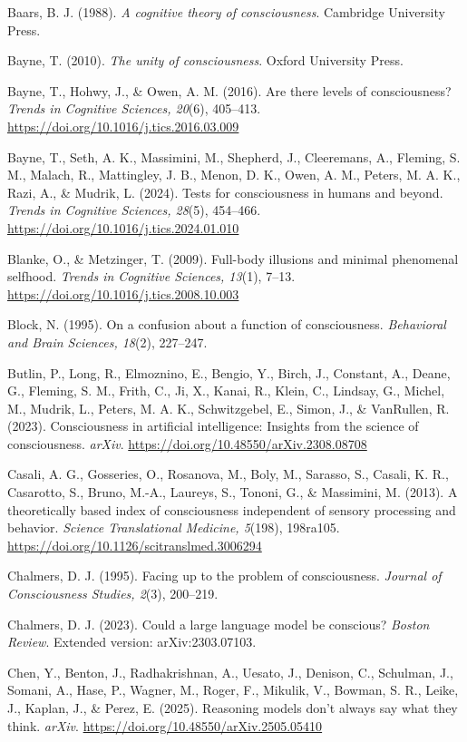 \documentclass[
  11pt,
]{article}
\begin{document}
Baars, B. J. (1988). \emph{A cognitive theory of consciousness}.
Cambridge University Press.

Bayne, T. (2010). \emph{The unity of consciousness}. Oxford University
Press.

Bayne, T., Hohwy, J., \& Owen, A. M. (2016). Are there levels of
consciousness? \emph{Trends in Cognitive Sciences, 20}(6), 405--413.
\url{https://doi.org/10.1016/j.tics.2016.03.009}

Bayne, T., Seth, A. K., Massimini, M., Shepherd, J., Cleeremans, A.,
Fleming, S. M., Malach, R., Mattingley, J. B., Menon, D. K., Owen, A.
M., Peters, M. A. K., Razi, A., \& Mudrik, L. (2024). Tests for
consciousness in humans and beyond. \emph{Trends in Cognitive Sciences,
28}(5), 454--466. \url{https://doi.org/10.1016/j.tics.2024.01.010}

Blanke, O., \& Metzinger, T. (2009). Full-body illusions and minimal
phenomenal selfhood. \emph{Trends in Cognitive Sciences, 13}(1), 7--13.
\url{https://doi.org/10.1016/j.tics.2008.10.003}

Block, N. (1995). On a confusion about a function of consciousness.
\emph{Behavioral and Brain Sciences, 18}(2), 227--247.

Butlin, P., Long, R., Elmoznino, E., Bengio, Y., Birch, J., Constant,
A., Deane, G., Fleming, S. M., Frith, C., Ji, X., Kanai, R., Klein, C.,
Lindsay, G., Michel, M., Mudrik, L., Peters, M. A. K., Schwitzgebel, E.,
Simon, J., \& VanRullen, R. (2023). Consciousness in artificial
intelligence: Insights from the science of consciousness. \emph{arXiv}.
\url{https://doi.org/10.48550/arXiv.2308.08708}

Casali, A. G., Gosseries, O., Rosanova, M., Boly, M., Sarasso, S.,
Casali, K. R., Casarotto, S., Bruno, M.-A., Laureys, S., Tononi, G., \&
Massimini, M. (2013). A theoretically based index of consciousness
independent of sensory processing and behavior. \emph{Science
Translational Medicine, 5}(198), 198ra105.
\url{https://doi.org/10.1126/scitranslmed.3006294}

Chalmers, D. J. (1995). Facing up to the problem of consciousness.
\emph{Journal of Consciousness Studies, 2}(3), 200--219.

Chalmers, D. J. (2023). Could a large language model be conscious?
\emph{Boston Review}. Extended version: arXiv:2303.07103.

Chen, Y., Benton, J., Radhakrishnan, A., Uesato, J., Denison, C.,
Schulman, J., Somani, A., Hase, P., Wagner, M., Roger, F., Mikulik, V.,
Bowman, S. R., Leike, J., Kaplan, J., \& Perez, E. (2025). Reasoning
models don't always say what they think. \emph{arXiv}.
\url{https://doi.org/10.48550/arXiv.2505.05410}
\end{document}
